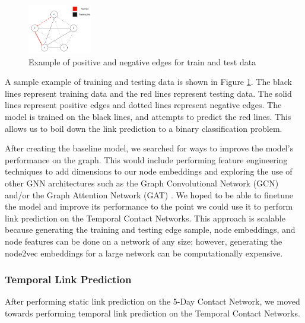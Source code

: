 \documentclass[times, 10pt,twocolumn]{article}
\begin{document}
\begin{figure}
    \centering
    \includegraphics[width=0.25\textwidth]{imgs/static_prediction_data_split.png}
    \caption{Example of positive and negative edges for train and test data}
    \label{fig:toy_edges_label}
\end{figure}

A sample example of training and testing data is shown in Figure \ref{fig:toy_edges_label}. The black lines represent training data and the red lines represent testing data. The solid lines represent positive edges and dotted lines represent negative edges. The model is trained on the black lines, and attempts to predict the red lines. This allows us to boil down the link prediction to a binary classification problem.

After creating the baseline model, we searched for ways to improve the model's performance on the graph. This would include performing feature engineering techniques to add dimensions to our node embeddings and exploring the use of other GNN architectures such as the Graph Convolutional Network (GCN) and/or the Graph Attention Network (GAT) \cite{kipf2017semisupervised} \cite{veličković2018graph}. We hoped to be able to finetune the model and improve its performance to the point we could use it to perform link prediction on the Temporal Contact Networks. This approach is scalable because generating the training and testing edge sample, node embeddings, and node features can be done on a network of any size; however, generating the node2vec embeddings for a large network can be computationally expensive.

\subsubsection{Temporal Link Prediction}
After performing static link prediction on the 5-Day Contact Network, we moved towards performing temporal link prediction on the Temporal Contact Networks. 



\end{document}

